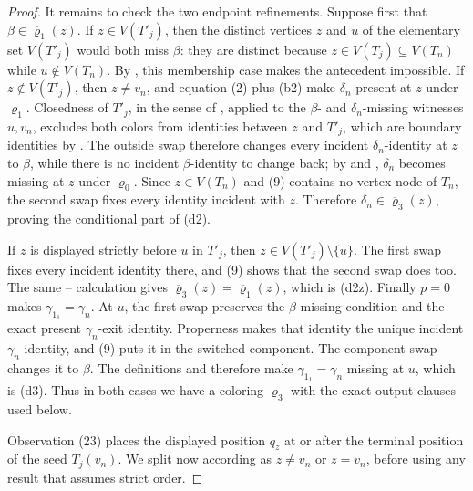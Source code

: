 \begin{proof}
It remains to check the two endpoint refinements.  Suppose first that
\(\beta\in\overline\varrho_1(z)\).  If \(z\in V(T'_j)\), then the
distinct vertices \(z\) and \(u\) of the elementary set \(V(T'_j)\)
would both miss \(\beta\): they are distinct because
\(z\in V(T_j)\subseteq V(T_n)\) while \(u\notin V(T_n)\).  By
, this membership case makes the
antecedent impossible.  If
\(z\notin V(T'_j)\), then \(z\ne v_n\), and equation (2) plus (b2) make
\(\delta_n\) present at \(z\) under \(\varrho_1\).  Closedness of
\(T'_j\), in the sense of , applied to
the \(\beta\)- and \(\delta_n\)-missing witnesses
\(u,v_n\), excludes both colors from identities between \(z\) and
\(T'_j\), which are boundary identities by .  The
outside swap therefore changes every incident
\(\delta_n\)-identity at \(z\) to \(\beta\), while there is no incident
\(\beta\)-identity to change back; by  and
, \(\delta_n\) becomes missing at \(z\) under
\(\varrho_0\).  Since \(z\in V(T_n)\) and (9) contains no vertex-node of
\(T_n\), the second swap fixes every identity incident with \(z\).
Therefore \(\delta_n\in\overline\varrho_3(z)\), proving the conditional
part of (d2).

If \(z\) is displayed strictly before \(u\) in \(T'_j\), then
\(z\in V(T'_j)\setminus\{u\}\).  The first swap fixes every incident
identity there, and (9) shows that the second swap does too.  The same
-- calculation gives
\(\overline\varrho_3(z)=\overline\varrho_1(z)\), which is (d2z).
Finally \(p=0\) makes \(\gamma_{1_1}=\gamma_n\).  At \(u\), the first
swap preserves the \(\beta\)-missing condition and the exact present
\(\gamma_n\)-exit identity.  Properness makes that identity the unique
incident \(\gamma_n\)-identity, and (9) puts it in the switched component.
The component swap changes it to \(\beta\).  The definitions
 and  therefore make
\(\gamma_{1_1}=\gamma_n\) missing at \(u\), which is (d3).  Thus in both
cases we
have a coloring \(\varrho_3\) with the exact output clauses used below.

Observation (23) places the displayed position \(q_z\) at or after the
terminal position of the seed \(T_j(v_n)\).  We split now according as
\(z\ne v_n\) or \(z=v_n\), before using any result that assumes strict
order.


\end{proof}
